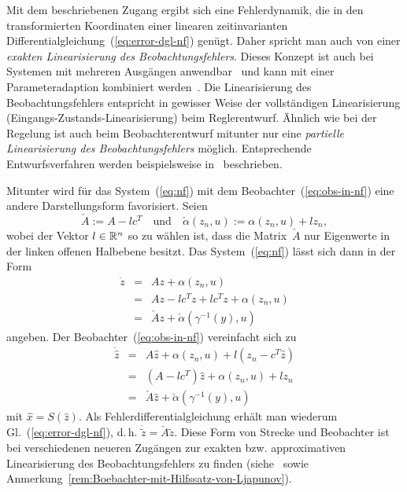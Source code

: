 \begin{remark}
Mit dem beschriebenen Zugang ergibt sich eine Fehlerdynamik, die in
den transformierten Koordinaten einer linearen zeit\-invarianten
Differentialgleichung~(\ref{eq:error-dgl-nf}) genügt. Daher spricht
man auch von einer \emph{exakten Linearisierung des Beobachtungsfehlers}.
Dieses Konzept ist auch bei Systemen mit mehreren Ausgängen anwendbar~\cite{krener85observer,xia88,xia89}
und kann mit einer Parameter\-adaption kombiniert werden~\cite{marino1990,marino1992,marino1995,marino1995book}.
Die Linearisierung des Beobachtungsfehlers entspricht in gewisser
Weise der vollständigen Linearisierung (Eingangs-Zustands-Linearisierung)
beim Reglerentwurf. Ähnlich wie bei der Regelung ist auch beim Beobachterentwurf
mitunter nur eine \emph{partielle Linearisierung des Beobachtungsfehlers}
möglich. Entsprechende Entwurfsverfahren werden beispielsweise in~\cite{jo2000b,jo2002,roebenack2005syncod,roebenack2006amcs,roebenack2007iet,roebenack2007ndst}
beschrieben.
\end{remark}

\begin{remark}
Mitunter wird für das System~(\ref{eq:nf}) mit dem Beobachter~(\ref{eq:obs-in-nf})
eine andere Darstellungsform favorisiert. Seien 
\[
\check{A}:=A-lc^{T}\quad\mbox{und}\quad\check{\alpha}(z_{n},u):=\alpha(z_{n},u)+lz_{n},
\]
wobei der Vektor $l\in{\mathbb{R}}^{n}$ so zu wählen ist, dass die Matrix~$\check{A}$
nur Eigenwerte in der linken offenen Halbebene besitzt. Das System~(\ref{eq:nf})
lässt sich dann in der Form 
\[
\begin{array}{ccl}
\dot{z} & = & Az+\alpha(z_{n},u)\\
 & = & Az-lc^{T}z+lc^{T}z+\alpha(z_{n},u)\\
 & = & \check{A}z+\check{\alpha}(\gamma^{-1}(y),u)
\end{array}
\]
angeben. Der Beobachter~(\ref{eq:obs-in-nf}) vereinfacht sich zu
\[
\begin{array}{ccl}
\dot{\hat{z}} & = & A\hat{z}+\alpha(z_{n},u)+l(z_{n}-c^{T}\hat{z})\\
 & = & (A-lc^{T})\hat{z}+\alpha(z_{n},u)+lz_{n}\\
 & = & \check{A}\hat{z}+\check{\alpha}(\gamma^{-1}(y),u)
\end{array}
\]
mit $\hat{x}=S(\hat{z})$. Als Fehlerdifferentialgleichung erhält
man wiederum Gl.~(\ref{eq:error-dgl-nf}), d.\,h. $\dot{\tilde{z}}=\check{A}\tilde{z}$.
Diese Form von Strecke und Beobachter ist bei verschiedenen neueren
Zugängen zur exakten bzw. approximativen Linearisierung des Beobachtungsfehlers
zu finden (siehe~\cite{kazantzis1998,krener2002,xiao2006,deutscher2006,deutscher2007}
sowie Anmerkung~\ref{rem:Boebachter-mit-Hilfssatz-von-Ljapunov}).
\end{remark}

